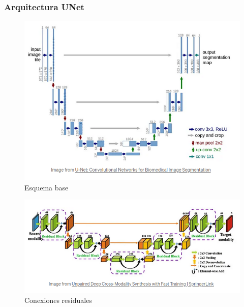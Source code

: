 \begin{frame}[allowframebreaks]
\frametitle{Arquitectura UNet}
    \begin{figure}
        \centering
        \includegraphics[scale=0.3]{img/section_07/UNet.png}
        \caption{Esquema base}
        \label{fig:unet-base}
    \end{figure}

    \begin{figure}
        \centering
        \includegraphics[scale=0.3]{img/section_07/ResUNet.png}
        \caption{Conexiones residuales}
        \label{fig:res-unet}
    \end{figure}


\end{frame}
